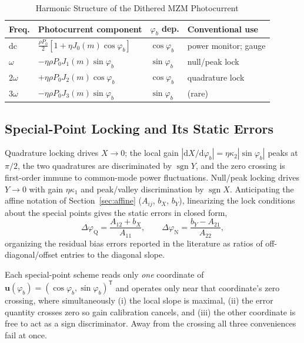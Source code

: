\documentclass[journal]{IEEEtran}
\newcommand{\uv}{\mathbf{u}}
\newcommand{\T}{\mathsf{T}}
\begin{document}
\begin{table}[!t]
\caption{Harmonic Structure of the Dithered MZM Photocurrent}
\label{tab:harm}
\centering
\begin{tabular}{llll}
\toprule
Freq. & Photocurrent component & $\varphi_b$ dep. & Conventional use\\
\midrule
dc & $\frac{\rho P_0}{2}[1{+}\eta J_0(m)\cos\varphi_b]$ & $\cos\varphi_b$ & power monitor; gauge\\
$\omega$ & $-\eta\rho P_0 J_1(m)\sin\varphi_b$ & $\sin\varphi_b$ & null/peak lock\\
$2\omega$ & $+\eta\rho P_0 J_2(m)\cos\varphi_b$ & $\cos\varphi_b$ & quadrature lock\\
$3\omega$ & $-\eta\rho P_0 J_3(m)\sin\varphi_b$ & $\sin\varphi_b$ & (rare)\\
\bottomrule
\end{tabular}
\end{table}

\subsection{Special-Point Locking and Its Static Errors}
\label{sec:conventional}
Quadrature locking drives $X\to 0$; the local gain
$|\mathrm{d}X/\mathrm{d}\varphi_b|=\eta\kappa_2|\sin\varphi_b|$ peaks at
$\pi/2$, the two quadratures are discriminated by $\operatorname{sgn}Y$,
and the zero crossing is first-order immune to common-mode power
fluctuations. Null/peak locking drives $Y\to0$ with gain $\eta\kappa_1$
and peak/valley discrimination by $\operatorname{sgn}X$. Anticipating
the affine notation of Section~\ref{sec:affine} ($A_{ij}$, $b_X$, $b_Y$),
linearizing the lock conditions about the special points gives the
static errors in closed form,
\begin{equation}
\Delta\varphi_{\mathrm Q}=\frac{A_{12}+b_X}{A_{11}},\qquad
\Delta\varphi_{\mathrm N}=\frac{b_Y-A_{21}}{A_{22}},
\label{eq:staticQ}
\end{equation}
organizing the residual bias errors reported in the literature as
ratios of off-diagonal/offset entries to the diagonal slope.

Each special-point scheme reads only \emph{one} coordinate of
$\uv(\varphi_b)=(\cos\varphi_b,\sin\varphi_b)^{\T}$ and operates only
near that coordinate's zero crossing, where simultaneously
(i) the local slope is maximal, (ii) the error quantity crosses zero so
gain calibration cancels, and (iii) the other coordinate is free to act
as a sign discriminator. Away from the crossing all three conveniences
fail at once.
\end{document}
